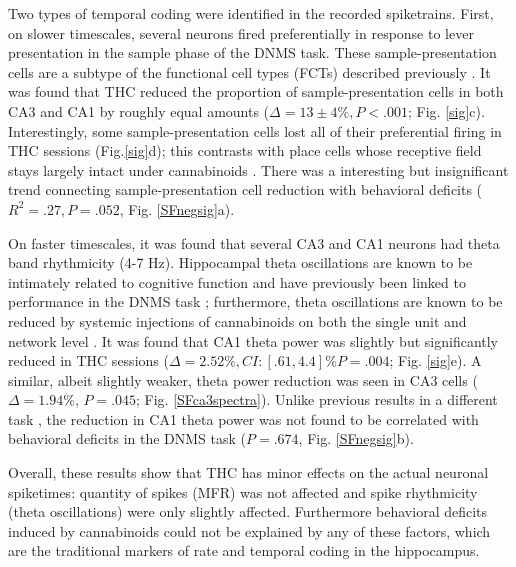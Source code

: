 \documentclass[11pt,a4paper,final]{article}
\begin{document}
Two types of temporal coding were identified in the recorded spiketrains.
First, on slower timescales, several neurons fired preferentially in response to lever presentation in the sample phase of the DNMS task.
These sample-presentation cells are a subtype of the functional cell types (FCTs) described previously \citep{hampson99}.
It was found that THC reduced the proportion of sample-presentation cells in both CA3 and CA1 by roughly equal amounts ($\Delta=13\pm4\%, P<.001$; Fig. \ref{sig}c).
Interestingly, some sample-presentation cells lost all of their preferential firing in THC sessions (Fig.\ref{sig}d); this contrasts with place cells whose receptive field stays largely intact under cannabinoids \citep{robbe09}.
There was a interesting but insignificant trend connecting sample-presentation cell reduction with behavioral deficits ($R^2=.27, P=.052$, Fig. \ref{SFnegsig}a).

On faster timescales, it was found that several CA3 and CA1 neurons had theta band rhythmicity (4-7 Hz).
Hippocampal theta oscillations are known to be intimately related to cognitive function \citep{buzsaki06,colgin13,moser13} and have previously been linked to performance in the DNMS task \citep{hasselmo10};
furthermore, theta oscillations are known to be reduced by systemic injections of cannabinoids on both the single unit \citep{robbe06} and network level \citep{kocsis08}.
It was found that CA1 theta power was slightly but significantly reduced in THC sessions ($\Delta=2.52\%, CI:[.61,4.4]\% P=.004$; Fig. \ref{sig}e).
A similar, albeit slightly weaker, theta power reduction was seen in CA3 cells ($\Delta=1.94\%$, $P=.045$; Fig. \ref{SFca3spectra}).
Unlike previous results in a different task \citep{robbe06}, the reduction in CA1 theta power was not found to be correlated with behavioral deficits in the DNMS task ($P=.674$, Fig. \ref{SFnegsig}b).

Overall, these results show that THC has minor effects on the actual neuronal spiketimes: quantity of spikes (MFR) was not affected and spike rhythmicity (theta oscillations) were only slightly affected.
Furthermore behavioral deficits induced by cannabinoids could not be explained by any of these factors, which are the traditional markers of rate and temporal coding in the hippocampus.
\end{document}
